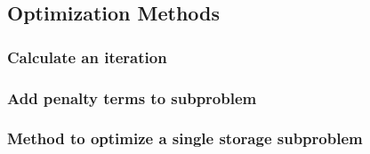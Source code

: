 \subsection{Optimization Methods}

\subsubsection{Calculate an iteration}
\label{sec:appendix:jl:optimization:calculate-iteration}



\subsubsection{Add penalty terms to subproblem}
\label{sec:appendix:jl:optimization:add-penalty-terms}




\subsubsection{Method to optimize a single storage subproblem}
\label{sec:appendix:jl:optimization:sub-storage}




